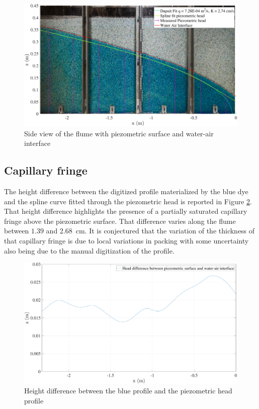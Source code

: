 \documentclass[
10pt, %
letterpaper, %
twoside, %
headinclude,footinclude, %
]{scrartcl}
\begin{document}
\begin{figure}[h]
	\centering
	\includegraphics[width=0.95\linewidth]{figures/dupuit_mano_water_190209.pdf}
	\caption{Side view of the flume with piezometric surface and water-air interface}
	\label{fig:unconfined}
\end{figure}%

\subsection{Capillary fringe}

The height difference between the digitized profile materialized by the blue dye and the spline curve fitted through the piezometric head is reported in Figure \ref{fig:deltaH}. That height difference highlights the presence of a partially saturated capillary fringe above the piezometric surface. That difference varies along the flume between $1.39$ and \SI{2.68}{cm}. It is conjectured that the variation of the thickness of that capillary fringe is due to local variations in packing with some uncertainty also being due to the manual digitization of the profile.

\begin{figure}[h]
	\centering
	\includegraphics[width=0.75\linewidth]{figures/head_diff_190209.pdf}
	\caption{Height difference between the blue profile and the piezometric head profile}
	\label{fig:deltaH}
\end{figure}%
\end{document}
